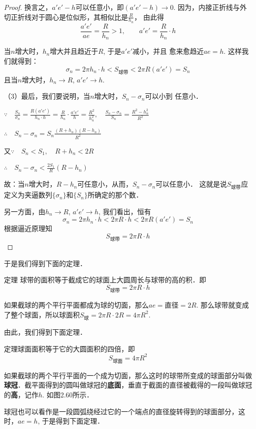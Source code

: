 \begin{proof}
换言之，$a'e'-h$可以任意小，即$(a'e'-h)\to 0$. 因为，内接正折线与外切正折线对于圆心是位似形，其相似比是$\frac{R}{h_n}$，
由此得
\[\frac{a'e'}{ae}=\frac{R}{h_n}>1,\qquad a'e'=\frac{R}{h_n}\cdot h\]

当$n$增大时，$h_n$增大并且趋近于$R$, 于是$a'e'$减小，并且
愈来愈趋近$ae=h$. 这样我们就得到：
\[\sigma_n=2\pi h_n\cdot h<S_{\text{球带}}<2\pi R(a'e')=S_n\]
且当$n$增大时，$h_n\to R$, $a'e'\to h$.

（3）最后，我们要说明，当$n$增大时，$S_n-\sigma_n$可以小到
任意小．

$\because\quad \frac{S_n}{\sigma_n}=\frac{R(a'e')}{h_n\cdot h}=\frac{R}{h_n}\cdot \frac{a'e'}{h}=\frac{R^2}{h^2_n},\quad \frac{S_n-\sigma_n}{S_n}=\frac{R^2-h^2_n}{R^2}$

$\therefore\quad S_n-\sigma_n=S_n\frac{(R+h_n) (R-h_n)}{R^2}$

又$\because\quad S_n<S_1,\quad R+h_n<2R$

$\therefore\quad S_n-\sigma_n<\frac{2S_1}{R}(R-h_n)$

故：当$n$增大时，$R-h_n$可任意小，从而，$S_n -\sigma_n$可以任意小．
这就是说$S_{\text{球带}}$应定义为夹逼数列$\{\sigma_n\}$和$\{S_n \}$所确定的那个数．

另一方面，由$h_n\to R$, $a'e'\to h$, 我们看出，恒有
\[\sigma_n=2\pi h_n\cdot h<2\pi R\cdot h<2\pi R (a'e') =S_n\]
根据逼近原理知
$$S_{\text{球带}}=2\pi R\cdot h$$
\end{proof}

于是我们得到下面的定理．

\begin{blk}
    {定理} 球带的面积等于截成它的球面上大圆周长与球带的高的积．即
\[S_{\text{球带}}=2\pi R\cdot h\]
\end{blk}

如果截球的两个平行平面都成为球的切面，那么$ae=$直径$=2R$. 那么球带就变成了整个球面，所以球面积$S_{\text{球}}=2\pi R\cdot 2R=4\pi R^2$.

由此，我们得到下面定理．

\begin{blk}
    {定理}球面面积等于它的大圆面积的四倍，即
\[S_{\text{球面}}=4\pi R^2\]
\end{blk}

如果截球的两个平行平面的一个成为切面，那么这时的球带所变成的球面部分叫做\textbf{球冠}．截平面得到的圆叫做球冠的\textbf{底面}，垂直于截面的直径被截得的一段叫做球冠的\textbf{高}，记作$h$. 如图2.60所示．

球冠也可以看作是一段圆弧绕经过它的一个端点的直径旋转得到的球面部分，这时，$ae=h$, 于是得到下面定理．


